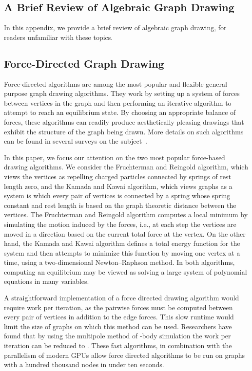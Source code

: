 \documentclass[oribibl,10pt]{llncs}
\begin{document}
\clearpage
\begin{appendix}
\section{A Brief Review of Algebraic Graph Drawing}
\label{app:gd}
In this appendix, we provide a brief review of algebraic graph drawing, for
readers unfamiliar with these topics.

\subsection{Force-Directed Graph Drawing}
Force-directed algorithms are among the most popular and flexible general purpose graph drawing algorithms. They work by setting up a system of forces between vertices in the graph and then performing an iterative algorithm to attempt to reach an equilibrium state. By choosing an appropriate balance of forces, these algorithms can readily produce aesthetically pleasing drawings that exhibit the structure of the graph being drawn. More details on such algorithms can be found in several surveys on the subject~.

In this paper, we focus our attention on the two most popular force-based drawing algorithms. We consider the Fruchterman and Reingold algorithm, which views the vertices as repelling charged particles connected by springs of rest length zero, and the Kamada and Kawai algorithm, which views graphs as a system is which every pair of vertices is connected by a spring whose spring constant and rest length is based on the graph theoretic distance between the vertices. The Fruchterman and Reingold algorithm computes a local minimum by simulating the motion induced by the forces, i.e., at each step the vertices are moved in a direction based on the current total force at the vertex. On the other hand, the Kamada and Kawai algorithm defines a total energy function for the system and then attempts to minimize this function by moving one vertex at a time, using a two-dimensional Newton--Raphson method. In both algorithms, computing an equilibrium may be viewed as solving a large system of polynomial equations in many variables.~\cite{FruRei-SPE-1991,KamKaw-IPL-1989}

A straightforward implementation of a force directed drawing algorithm would require  work per iteration, as the pairwise forces must be computed between every pair of vertices in addition to the edge forces. This slow runtime would limit the size of graphs on which this method can be used. Researchers have found that by using the multipole method of -body simulation  the work per iteration can be reduced to . These fast algorithms, in combination with the parallelism of modern GPUs  allow force directed algorithms to be run on graphs with a hundred thousand nodes in under ten seconds.


\end{appendix}
\end{document}

